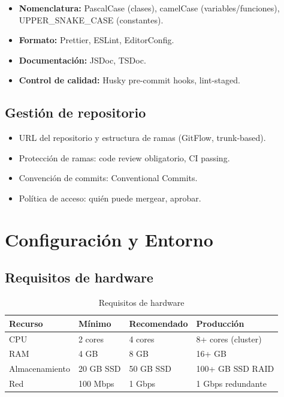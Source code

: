 \documentclass[a4paper,11pt,spanish]{article}
\begin{document}
\begin{itemize}
    \item \textbf{Nomenclatura:} PascalCase (clases), camelCase (variables/funciones), UPPER\_SNAKE\_CASE (constantes).
    \item \textbf{Formato:} Prettier, ESLint, EditorConfig.
    \item \textbf{Documentación:} JSDoc, TSDoc.
    \item \textbf{Control de calidad:} Husky pre-commit hooks, lint-staged.
\end{itemize}

\subsection{Gestión de repositorio}

\begin{itemize}
    \item URL del repositorio y estructura de ramas (GitFlow, trunk-based).
    \item Protección de ramas: code review obligatorio, CI passing.
    \item Convención de commits: Conventional Commits.
    \item Política de acceso: quién puede mergear, aprobar.
\end{itemize}

\newpage

\section{Configuración y Entorno}

\subsection{Requisitos de hardware}

\begin{table}[H]
\centering
\caption{Requisitos de hardware}
\label{tab:hardware}
\begin{tabular}{@{}llll@{}}
\toprule
\textbf{Recurso} & \textbf{Mínimo} & \textbf{Recomendado} & \textbf{Producción} \\
\midrule
CPU & 2 cores & 4 cores & 8+ cores (cluster) \\
RAM & 4 GB & 8 GB & 16+ GB \\
Almacenamiento & 20 GB SSD & 50 GB SSD & 100+ GB SSD RAID \\
Red & 100 Mbps & 1 Gbps & 1 Gbps redundante \\
\bottomrule
\end{tabular}
\end{table}
\end{document}
